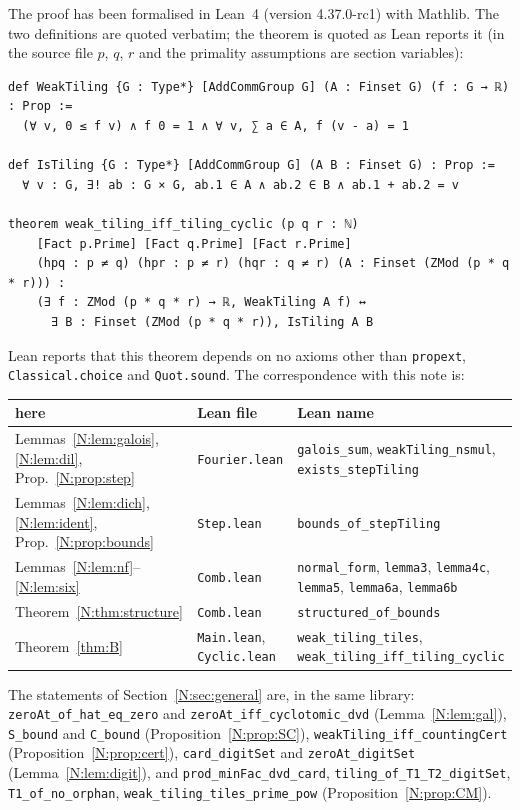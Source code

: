 \documentclass[11pt,a4paper]{amsart}
\theoremstyle{definition}
\theoremstyle{remark}
\newcommand{\lean}[1]{\texttt{#1}}
\begin{document}
The proof has been formalised in Lean~4 (version 4.37.0-rc1) with Mathlib. The two definitions are quoted
verbatim; the theorem is quoted as Lean reports it (in the source file $p$, $q$, $r$ and the primality
assumptions are section variables):
{\small
\begin{verbatim}
def WeakTiling {G : Type*} [AddCommGroup G] (A : Finset G) (f : G → ℝ) : Prop :=
  (∀ v, 0 ≤ f v) ∧ f 0 = 1 ∧ ∀ v, ∑ a ∈ A, f (v - a) = 1

def IsTiling {G : Type*} [AddCommGroup G] (A B : Finset G) : Prop :=
  ∀ v : G, ∃! ab : G × G, ab.1 ∈ A ∧ ab.2 ∈ B ∧ ab.1 + ab.2 = v

theorem weak_tiling_iff_tiling_cyclic (p q r : ℕ)
    [Fact p.Prime] [Fact q.Prime] [Fact r.Prime]
    (hpq : p ≠ q) (hpr : p ≠ r) (hqr : q ≠ r) (A : Finset (ZMod (p * q * r))) :
    (∃ f : ZMod (p * q * r) → ℝ, WeakTiling A f) ↔
      ∃ B : Finset (ZMod (p * q * r)), IsTiling A B
\end{verbatim}}
\noindent Lean reports that this theorem depends on no axioms other than \texttt{propext},
\texttt{Classical.choice} and \texttt{Quot.sound}. The correspondence with this note is:

\medskip
\begin{center}\small
\begin{tabular}{p{}p{}p{}}
\hline
here & Lean file & Lean name\\
\hline
Lemmas~\ref{N:lem:galois}, \ref{N:lem:dil}, Prop.~\ref{N:prop:step} & \lean{Fourier.lean} &
 \lean{galois\_sum}, \lean{weakTiling\_nsmul}, \lean{exists\_stepTiling}\\
Lemmas~\ref{N:lem:dich}, \ref{N:lem:ident}, Prop.~\ref{N:prop:bounds} & \lean{Step.lean} & \lean{bounds\_of\_stepTiling}\\
Lemmas~\ref{N:lem:nf}--\ref{N:lem:six} & \lean{Comb.lean} & \lean{normal\_form}, \lean{lemma3}, \lean{lemma4c},
 \lean{lemma5}, \lean{lemma6a}, \lean{lemma6b}\\
Theorem~\ref{N:thm:structure} & \lean{Comb.lean} & \lean{structured\_of\_bounds}\\
Theorem~\ref{thm:B} & \lean{Main.lean}, \lean{Cyclic.lean} & \lean{weak\_tiling\_tiles},
 \lean{weak\_tiling\_iff\_tiling\_cyclic}\\
\hline
\end{tabular}
\end{center}
\medskip

{\sloppy\noindent The statements of Section~\ref{N:sec:general} are, in the same library: \lean{zeroAt\_of\_hat\_eq\_zero} and
\lean{zeroAt\_iff\_cyclotomic\_dvd} (Lemma~\ref{N:lem:gal}), \lean{S\_bound} and \lean{C\_bound}
(Proposition~\ref{N:prop:SC}), \lean{weakTiling\_iff\_countingCert} (Proposition~\ref{N:prop:cert}),
\lean{card\_digitSet} and \lean{zeroAt\_digitSet} (Lemma~\ref{N:lem:digit}), and \lean{prod\_minFac\_dvd\_card},
\lean{tiling\_of\_T1\_T2\_digitSet}, \lean{T1\_of\_no\_orphan}, \lean{weak\_tiling\_tiles\_prime\_pow}
(Proposition~\ref{N:prop:CM}).\par}
\end{document}
